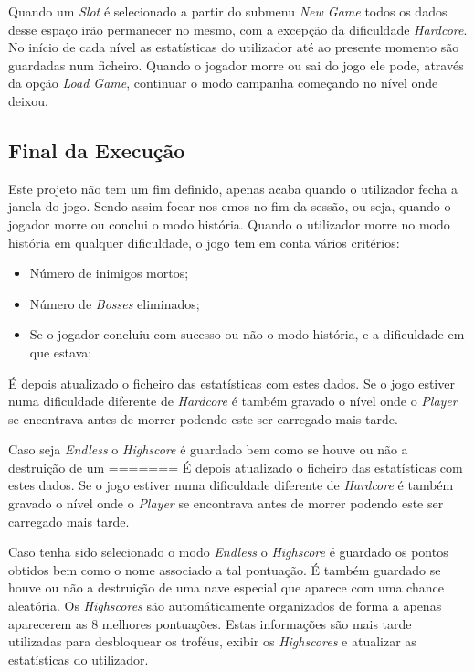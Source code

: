 \documentclass[a4paper,11pt]{article}
\newcommand\tabitem{\setlength{\itemindent}{1cm}}
\newcommand\tab[1][0.8cm]{\hspace*{#1}}
\begin{document}
\tab Quando um \textit{Slot} é selecionado a partir do submenu \textit{New Game} todos os dados desse espaço irão permanecer no mesmo, com a excepção da dificuldade \textit{Hardcore}. No início de cada nível as estatísticas do utilizador até ao presente momento são guardadas num ficheiro. Quando o jogador morre ou sai do jogo ele pode, através da opção \textit{Load Game}, continuar o modo campanha começando no nível onde deixou.

\pagebreak

\subsection{Final da Execução}
\tab Este projeto não tem um fim definido, apenas acaba quando o utilizador fecha a janela do jogo. Sendo assim focar-nos-emos no fim da sessão, ou seja, quando o jogador morre ou conclui o modo história. Quando o utilizador morre no modo história em qualquer dificuldade, o jogo tem em conta vários critérios:
\begin{itemize}
    \tabitem
    \item Número de inimigos mortos;
    \item Número de \textit{Bosses} eliminados;
    \item Se o jogador concluiu com sucesso ou não o modo história, e a dificuldade em que estava;
\end{itemize}
É depois atualizado o ficheiro das estatísticas com estes dados. Se o jogo estiver numa dificuldade diferente de \textit{Hardcore} é também gravado o nível onde o \textit{Player} se encontrava antes de morrer podendo este ser carregado mais tarde.

\vspace*{8pt}

Caso seja \textit{Endless} o \textit{Highscore} é guardado bem como se houve ou não a destruição de um
=======
É depois atualizado o ficheiro das estatísticas com estes dados. Se o jogo estiver numa dificuldade diferente de \textit{Hardcore} é também gravado o nível onde o \textit{Player} se encontrava antes de morrer podendo este ser carregado mais tarde.

\vspace{8pt}

Caso tenha sido selecionado o modo \textit{Endless} o \textit{Highscore} é guardado os pontos obtidos bem como o nome associado a tal pontuação. É também guardado se houve ou não a destruição de uma nave especial que aparece com uma chance aleatória. Os \textit{Highscores} são automáticamente organizados de forma a apenas aparecerem as 8 melhores pontuações.
Estas informações são mais tarde utilizadas para desbloquear os troféus, exibir os \textit{Highscores} e atualizar as estatísticas	do utilizador.
\end{document}
